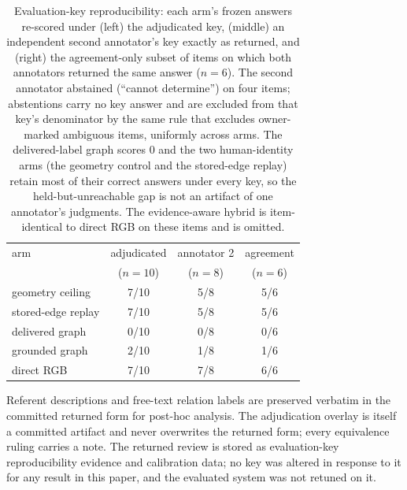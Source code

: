 \begin{table}[t]
  \centering\footnotesize
  \setlength{\tabcolsep}{3pt}
  \begin{tabular}{@{}lccc@{}}
    \toprule
    arm & adjudicated & annotator 2 & agreement\\
        & ($n{=}10$)  & ($n{=}8$)   & ($n{=}6$)\\
    \midrule
    geometry ceiling   & 7/10 & 5/8 & 5/6\\
    stored-edge replay & 7/10 & 5/8 & 5/6\\
    delivered graph    & 0/10 & 0/8 & 0/6\\
    grounded graph     & 2/10 & 1/8 & 1/6\\
    direct RGB         & 7/10 & 7/8 & 6/6\\
    \bottomrule
  \end{tabular}
  \caption{Evaluation-key reproducibility: each arm's frozen answers re-scored
  under (left) the adjudicated key, (middle) an independent second annotator's
  key exactly as returned, and (right) the agreement-only subset of items on
  which both annotators returned the same answer ($n{=}6$). The second
  annotator abstained (``cannot determine'') on four items; abstentions carry
  no key answer and are excluded from that key's denominator by the same rule
  that excludes owner-marked ambiguous items, uniformly across arms. The
  delivered-label graph scores 0 and the two human-identity arms (the
  geometry control and the stored-edge replay) retain most of their correct
  answers under every key, so the held-but-unreachable gap is not an artifact
  of one annotator's judgments. The evidence-aware hybrid is item-identical
  to direct RGB on these items and is omitted.}
  \label{tab:key-sensitivity}
\end{table}

Referent descriptions and free-text relation labels are preserved verbatim
in the committed returned form for post-hoc analysis. The adjudication
overlay is itself a committed artifact and never overwrites the returned
form; every equivalence ruling carries a note. The returned review is
stored as evaluation-key reproducibility evidence and calibration data; no
key was altered in response to it for any result in this paper, and the
evaluated system was not retuned on it.
